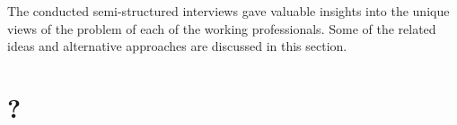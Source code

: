 The conducted semi-structured interviews gave valuable insights into
the unique views of the problem of each of the working professionals.
Some of the related ideas and alternative approaches are discussed in this section.







\section{?}
































